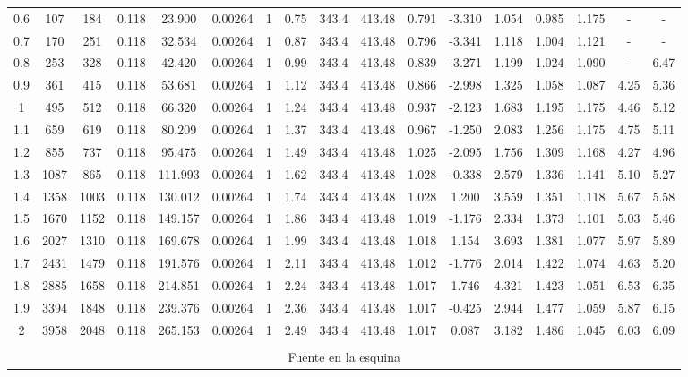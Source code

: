 \begin{landscape}
\begin{table}[ht]
{\begin{tabular}{@{}ccccccccccccccccc@{}}
0.6 & 107 & 184 & 0.118 & 23.900 & 0.00264 & 1 & 0.75 & 343.4 & 413.48 & 0.791 & -3.310 & 1.054 & 0.985 & 1.175 & - & - \\
0.7 & 170 & 251 & 0.118 & 32.534 & 0.00264 & 1 & 0.87 & 343.4 & 413.48 & 0.796 & -3.341 & 1.118 & 1.004 & 1.121 & - & - \\
0.8 & 253 & 328 & 0.118 & 42.420 & 0.00264 & 1 & 0.99 & 343.4 & 413.48 & 0.839 & -3.271 & 1.199 & 1.024 & 1.090 & - & 6.47 \\
0.9 & 361 & 415 & 0.118 & 53.681 & 0.00264 & 1 & 1.12 & 343.4 & 413.48 & 0.866 & -2.998 & 1.325 & 1.058 & 1.087 & 4.25 & 5.36 \\
1 & 495 & 512 & 0.118 & 66.320 & 0.00264 & 1 & 1.24 & 343.4 & 413.48 & 0.937 & -2.123 & 1.683 & 1.195 & 1.175 & 4.46 & 5.12 \\
1.1 & 659 & 619 & 0.118 & 80.209 & 0.00264 & 1 & 1.37 & 343.4 & 413.48 & 0.967 & -1.250 & 2.083 & 1.256 & 1.175 & 4.75 & 5.11 \\
1.2 & 855 & 737 & 0.118 & 95.475 & 0.00264 & 1 & 1.49 & 343.4 & 413.48 & 1.025 & -2.095 & 1.756 & 1.309 & 1.168 & 4.27 & 4.96 \\
1.3 & 1087 & 865 & 0.118 & 111.993 & 0.00264 & 1 & 1.62 & 343.4 & 413.48 & 1.028 & -0.338 & 2.579 & 1.336 & 1.141 & 5.10 & 5.27 \\
1.4 & 1358 & 1003 & 0.118 & 130.012 & 0.00264 & 1 & 1.74 & 343.4 & 413.48 & 1.028 & 1.200 & 3.559 & 1.351 & 1.118 & 5.67 & 5.58 \\
1.5 & 1670 & 1152 & 0.118 & 149.157 & 0.00264 & 1 & 1.86 & 343.4 & 413.48 & 1.019 & -1.176 & 2.334 & 1.373 & 1.101 & 5.03 & 5.46 \\
1.6 & 2027 & 1310 & 0.118 & 169.678 & 0.00264 & 1 & 1.99 & 343.4 & 413.48 & 1.018 & 1.154 & 3.693 & 1.381 & 1.077 & 5.97 & 5.89 \\
1.7 & 2431 & 1479 & 0.118 & 191.576 & 0.00264 & 1 & 2.11 & 343.4 & 413.48 & 1.012 & -1.776 & 2.014 & 1.422 & 1.074 & 4.63 & 5.20 \\
1.8 & 2885 & 1658 & 0.118 & 214.851 & 0.00264 & 1 & 2.24 & 343.4 & 413.48 & 1.017 & 1.746 & 4.321 & 1.423 & 1.051 & 6.53 & 6.35 \\
1.9 & 3394 & 1848 & 0.118 & 239.376 & 0.00264 & 1 & 2.36 & 343.4 & 413.48 & 1.017 & -0.425 & 2.944 & 1.477 & 1.059 & 5.87 & 6.15 \\
2 & 3958 & 2048 & 0.118 & 265.153 & 0.00264 & 1 & 2.49 & 343.4 & 413.48 & 1.017 & 0.087 & 3.182 & 1.486 & 1.045 & 6.03 & 6.09 \\ \bottomrule
\\
\multicolumn{17}{c}{Fuente en la esquina} \\ \toprule

\end{tabular}}
\end{table}
\end{landscape}

